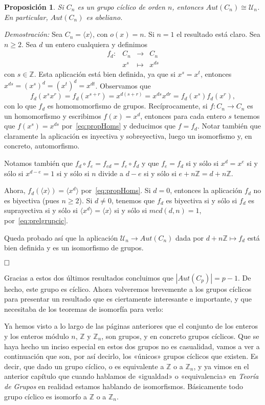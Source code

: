 \documentclass[12pt]{article}
\newtheorem{proposition}[theorem]{Proposición}
\begin{document}
\begin{proposition}Si $C_n$ es un grupo cíclico de orden $n$, entonces $Aut(C_n) \cong \mathcal{U}_n$. En particular, $Aut(C_n)$ es abeliano.
\end{proposition}
\emph{Demostración: }Sea $C_n = \langle x \rangle$, con $o(x)=n$. Si $n = 1$ el resultado está claro. Sea $n \geq 2$. Sea $d$ un entero cualquiera y definimos $$\begin{array}{rccl}
f_d \colon &C_n&\longrightarrow &C_n \\
&x^s& \longmapsto &x^{ds}
\end{array}
$$
con $s \in \mathbb{Z}$. Esta aplicación está bien definida, ya que si $x^s = x^t$, entonces $x^{ds}= (x^s)^d=(x^t)^d= x^{dt}$. Observamos que $$f_d(x^sx^r)=f_d(x^{s+r})=x^{d(s+r)} = x^{ds}x^{dr} = f_d(x^s)f_d(x^r),$$ con lo que $f_d$ es homomomorfismo de grupos. Recíprocamente, si $f \colon C_n \longrightarrow C_n$ es un homomorfismo y escribimos $f(x)=x^d$, entonces para cada entero $s$ tenemos que $f(x^s) = x^{ds}$ por~\ref{eq:propHoms} y deducimos que $f=f_d$. Notar también que claramente la aplicación es inyectiva y sobreyectiva, luego un isomorfismo y, en concreto, automorfismo.

Notamos también que $f_d \circ f_e = f_{ed} = f_e \circ f_d$ y que $f_e = f_d$ si y sólo si $x^d = x^e$ si y sólo si $x^{d-e}=1$ si y sólo si $n$ divide a $d-e$ si y sólo si $e+n\mathbb{Z} = d+n\mathbb{Z}.$

Ahora, $f_d( \langle x \rangle ) = \langle x^d \rangle$ por~\ref{eq:propHoms}. Si $d = 0$, entonces la aplicación $f_d$ no es biyectiva (pues $n\geq 2$). Si $d \neq 0$, tenemos que $f_d$ es biyectiva si y sólo si $f_d$ es suprayectiva si y sólo si $\langle x^d \rangle = \langle x \rangle$ si y sólo si $mcd(d,n)=1$, por~\ref{eq:prelgrupcic}.

Queda probado así que la aplicación $\mathcal{U}_n \longrightarrow Aut(C_n)$ dada por $d+n\mathbb{Z} \longmapsto f_d$ está bien definida y es un isomorfismo de grupos.

$\hfill \square$

Gracias a estos dos últimos resultados concluimos que $|Aut(C_p)| = p-1$. De hecho, este grupo es cíclico. Ahora volveremos brevemente a los grupos cíclicos para presentar un resultado que es ciertamente interesante e importante, y que necesitaba de los teoremas de isomorfía para verlo:

Ya hemos visto a lo largo de las páginas anteriores que el conjunto de los enteros y los enteros módulo $n$, $\mathbb{Z}$ y $\mathbb{Z}_{n}$, son grupos, y en concreto grupos cíclicos. Que se haya hecho un inciso especial en estos dos grupos no es casualidad, vamos a ver a continuación que son, por así decirlo, los «únicos» grupos cíclicos que existen. Es decir, que dado un grupo cíclico, o es equivalente a $\mathbb{Z}$ o a $\mathbb{Z}_{n}$, y ya vimos en el anterior capítulo que cuando hablamos de «igualdad» o «equivalencia» en \textit{Teoría de Grupos} en realidad estamos hablando de isomorfismos. Básicamente todo grupo cíclico es isomorfo a $\mathbb{Z}$ o a $\mathbb{Z}_{n}$.
\end{document}
